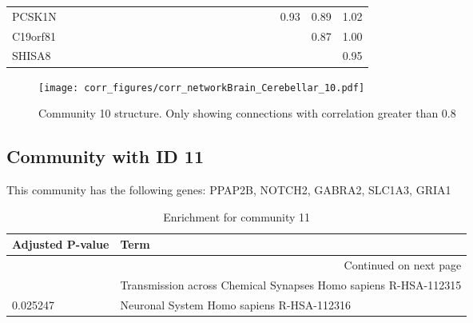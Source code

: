 \begin{longtable}{lrrrrrrrrrrrrrrrrrrrrrr}
PCSK1N        &            &             &            &               &             &               &              &             &              &             &                &                     &             &               &              &              &              &            &              &           0.93 &         0.89 &         1.02 \\
C19orf81      &            &             &            &               &             &               &              &             &              &             &                &                     &             &               &              &              &              &            &              &                &         0.87 &         1.00 \\
SHISA8        &            &             &            &               &             &               &              &             &              &             &                &                     &             &               &              &              &              &            &              &                &              &         0.95 \\
\end{longtable}


\begin{figure}[h!]
\centering
\texttt{[image: corr\_figures/corr\_networkBrain\_Cerebellar\_10.pdf]}
\caption{Community 10 structure. Only showing connections with correlation greater than 0.8}
\end{figure}




\subsection*{Community with ID 11}
This community has the following genes: PPAP2B, NOTCH2, GABRA2, SLC1A3, GRIA1
\\
\begin{longtable}{p{2.4cm}p{14.5cm}}
\caption{Enrichment for community 11}\\
\toprule
Adjusted \newline P-value &                                                             Term \\
\midrule
\endhead
\midrule
\multicolumn{2}{r}{{Continued on next page}} \\
\midrule
\endfoot

\bottomrule
\endlastfoot
                 0.017438 &  Transmission across Chemical Synapses Homo sapiens R-HSA-112315 \\
                 0.025247 &                        Neuronal System Homo sapiens R-HSA-112316 \\
\end{longtable}


